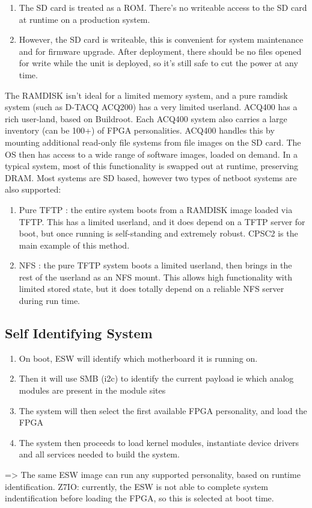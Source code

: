 \documentclass[]{article}
\begin{document}
\begin{enumerate}
    \item The SD card is treated as a ROM. There’s no writeable access to the SD card at runtime on a production system.
    \item However, the SD card is writeable, this is convenient for system maintenance and for firmware upgrade.  After deployment, there should be no files opened for write while the unit is deployed, so it’s still safe to cut the power at any time.
\end{enumerate} 
The RAMDISK isn’t ideal for a limited memory system, and a pure ramdisk system (such as D-TACQ ACQ200) has a very limited userland. ACQ400 has a rich user-land, based on Buildroot. Each ACQ400 system also carries a large inventory (can be 100+) of FPGA personalities. ACQ400 handles this by mounting additional read-only file systems from file images on the SD card. The OS then has access to a wide range of software images, loaded on demand. In a typical system, most of this functionality is swapped out at runtime, preserving DRAM.
Most systems are SD based, however two types of netboot systems are also supported:
\begin{enumerate}
    \item Pure TFTP : the entire system boots from a RAMDISK image loaded via TFTP. This has a limited userland, and it does depend on a TFTP server for boot, but once running is self-standing and extremely robust. CPSC2 is the main example of this method.
    \item NFS : the pure TFTP system boots a limited userland, then brings in the rest of the userland as an NFS mount. This allows high functionality with limited stored state, but it does totally depend on a reliable NFS server during run time.
\end{enumerate} 

\subsection{Self Identifying System}
\begin{enumerate}
    \item On boot, ESW will identify which motherboard it is running on.
    \item Then it will use SMB (i2c) to identify the current payload 
        	ie which analog modules are present in the module sites
    \item The system will then select the first available FPGA personality, and load the FPGA
    \item The system then proceeds to load kernel modules, instantiate device drivers and all services needed to build the system.
\end{enumerate}
=> The same ESW image can run any supported personality, based on runtime identification.
Z7IO: currently, the ESW is not able to complete system indentification before loading the FPGA, so this is selected at boot time.
\end{document}

